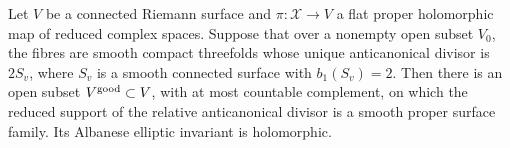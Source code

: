 \begin{lemma}\hypertarget{tag-032B}{}\label{push:src:D.1.2}

Let \(V\) be a connected Riemann surface and
\(\pi:\mathcal X\to V\) a flat proper holomorphic map of reduced
complex spaces. Suppose that over a nonempty open subset \(V_0\), the
fibres are smooth compact threefolds whose unique anticanonical divisor
is \(2S_v\), where \(S_v\) is a smooth connected surface with
\(b_1(S_v)=2\). Then there is an open subset \(V^{\rm good}\subset V\), with at
most countable complement, on which the reduced support of the
relative anticanonical divisor is a smooth proper surface family. Its
Albanese elliptic invariant is holomorphic.
\end{lemma}


